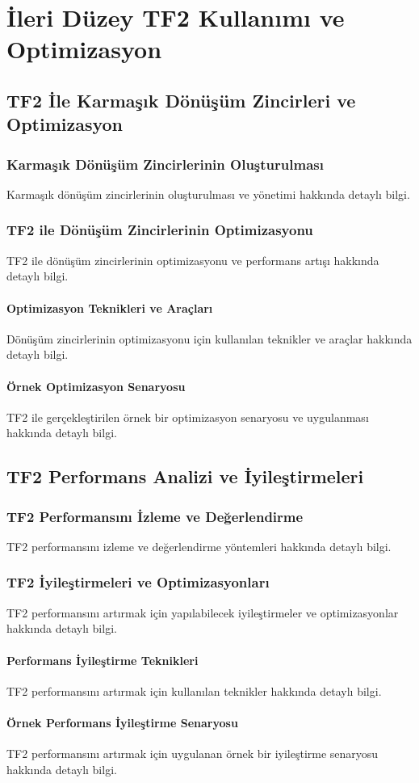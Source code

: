 \chapter{İleri Düzey TF2 Kullanımı ve Optimizasyon}

\section{TF2 İle Karmaşık Dönüşüm Zincirleri ve Optimizasyon}
\subsection{Karmaşık Dönüşüm Zincirlerinin Oluşturulması}
Karmaşık dönüşüm zincirlerinin oluşturulması ve yönetimi hakkında detaylı bilgi.

\subsection{TF2 ile Dönüşüm Zincirlerinin Optimizasyonu}
TF2 ile dönüşüm zincirlerinin optimizasyonu ve performans artışı hakkında detaylı bilgi.

\subsubsection{Optimizasyon Teknikleri ve Araçları}
Dönüşüm zincirlerinin optimizasyonu için kullanılan teknikler ve araçlar hakkında detaylı bilgi.

\subsubsection{Örnek Optimizasyon Senaryosu}
TF2 ile gerçekleştirilen örnek bir optimizasyon senaryosu ve uygulanması hakkında detaylı bilgi.

\section{TF2 Performans Analizi ve İyileştirmeleri}
\subsection{TF2 Performansını İzleme ve Değerlendirme}
TF2 performansını izleme ve değerlendirme yöntemleri hakkında detaylı bilgi.

\subsection{TF2 İyileştirmeleri ve Optimizasyonları}
TF2 performansını artırmak için yapılabilecek iyileştirmeler ve optimizasyonlar hakkında detaylı bilgi.

\subsubsection{Performans İyileştirme Teknikleri}
TF2 performansını artırmak için kullanılan teknikler hakkında detaylı bilgi.

\subsubsection{Örnek Performans İyileştirme Senaryosu}
TF2 performansını artırmak için uygulanan örnek bir iyileştirme senaryosu hakkında detaylı bilgi.
